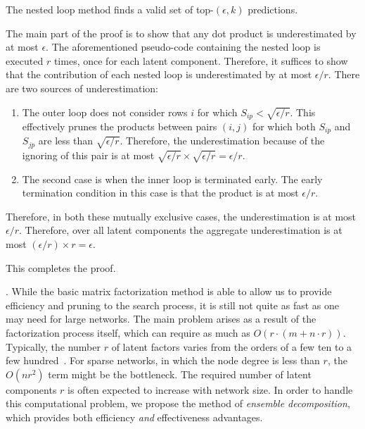 \begin{prop}
The nested loop method finds a valid set of top-$(\epsilon, k)$
predictions.
\end{prop}
\begin{IEEEproof}
The main part of the proof is to show that any dot product is
underestimated by at most  $\epsilon$. The aforementioned pseudo-code
containing the  nested loop is executed $r$ times, once for each
latent component. Therefore, it suffices to show that the
contribution of each nested loop is underestimated by at most
$\epsilon/r$. There are two sources of underestimation:
\begin{enumerate}
\item  The outer loop does not consider rows $i$ for which $S_{ip} <
\sqrt{\epsilon/r}$. This effectively prunes the products between
pairs $(i, j)$ for which both $S_{ip}$ and $S_{jp}$ are less
than $\sqrt{\epsilon/r}$. Therefore, the underestimation because of
the ignoring of this pair is at most $\sqrt{\epsilon/r} \times
\sqrt{\epsilon/r} = \epsilon/r$.
\item The second case is when the inner loop is terminated early.
The early termination condition in this case is that the product is
at most $\epsilon/r$.
\end{enumerate}
Therefore, in both these mutually exclusive cases, the
underestimation is at most $\epsilon/r$. Therefore, over all latent
components the aggregate underestimation is at most
$(\epsilon/r)\times r= \epsilon$.

This completes the proof.
\end{IEEEproof}

. While the basic matrix factorization method is able to allow us to provide
efficiency and pruning to the search process, it is still not quite
as fast as one may need for large networks. The main problem
arises as a result of the factorization process itself, which can
require as much as $O(r \cdot (m + n\cdot r))$.  Typically, the
number $r$ of latent factors varies from the orders of a few ten to a few hundred~\cite{NMF-nature99, NMF-www2010}. For
sparse networks, in which the node degree is less than $r$, the $O(n
r^2)$ term might be the bottleneck.  The required  number of latent
components $r$ is often expected to increase with network size. In
order to handle this computational problem, we propose the method of
{\em ensemble decomposition}, which provides both efficiency {\em
and} effectiveness advantages.
